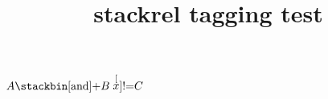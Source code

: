 \documentclass{article}
\title{stackrel tagging test}
\begin{document}
$A \stackbin[\text{and}]{}{+} B \stackrel[x]{!}{=} C$
\end{document}
